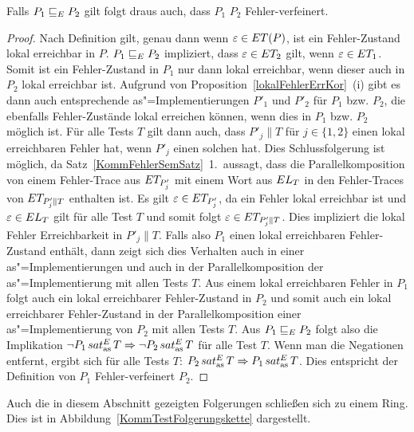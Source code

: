 \begin{Satz}
  \label{KommTestVerfSatz}
  Falls $P_1 \sqsubseteq  _E P_2$ gilt folgt draus auch, dass $P_1$ $P_2$
  Fehler-verfeinert.
\end{Satz}
\begin{proof}
  Nach Definition gilt, genau dann wenn $\varepsilon\in ET (P)$, ist ein
  Fehler-Zustand lokal erreichbar in $P$. $P_1 \sqsubseteq  _E P_2$ impliziert, dass
  $\varepsilon\in ET _2$ gilt, wenn $\varepsilon\in ET _1$. Somit ist ein
  Fehler-Zustand in $P_1$ nur dann lokal erreichbar, wenn dieser auch in $P_2$
  lokal erreichbar ist. Aufgrund von Proposition~\ref{lokalFehlerErrKor}~(i)
  gibt es dann auch entsprechende as"=Implementierungen $P'_1$ und $P'_2$ für
  $P_1$ bzw. $P_2$, die ebenfalls Fehler-Zustände lokal erreichen können, wenn
  dies in $P_1$ bzw. $P_2$ möglich ist. Für alle Tests $T$ gilt dann auch, dass
  $P'_j\|T$ für $j\in\{1,2\}$ einen lokal erreichbaren Fehler hat, wenn $P'_j$
  einen solchen hat. Dies Schlussfolgerung ist möglich, da
  Satz~\ref{KommFehlerSemSatz}~1.\ aussagt, dass die Parallelkomposition von
  einem Fehler-Trace aus $ET _{P'_j}$ mit einem Wort aus $EL _T$ in den
  Fehler-Traces von $ET _{P'_j\|T}$ enthalten ist. Es gilt $\varepsilon\in ET
  _{P'_j}$, da ein Fehler lokal erreichbar ist und $\varepsilon\in EL _T$ gilt
  für alle Test $T$ und somit folgt $\varepsilon\in ET _{P'_j\|T}$. Dies
  impliziert die lokal Fehler Erreichbarkeit in $P'_j\|T$. Falls also $P_1$
  einen lokal erreichbaren Fehler-Zustand enthält, dann zeigt sich dies
  Verhalten auch in einer as"=Implementierungen und auch in der
  Parallelkomposition der as"=Implementierung mit allen Tests $T$. Aus einem
  lokal erreichbaren Fehler in $P_1$ folgt auch ein lokal erreichbarer
  Fehler-Zustand in $P_2$ und somit auch ein lokal erreichbarer Fehler-Zustand
  in der Parallelkomposition einer as"=Implementierung von $P_2$ mit allen
  Tests $T$. Aus $P_1 \sqsubseteq  _E P_2$ folgt also die Implikation $\neg P_1 \hspace{0.05cm}sat_\mathrm{as}^E\hspace{0.05cm} T
  \Rightarrow \neg P_2 \hspace{0.05cm}sat_\mathrm{as}^E\hspace{0.05cm} T$ für alle Test $T$. Wenn man die Negationen
  entfernt, ergibt sich für alle Tests $T$: $P_2\hspace{0.05cm}sat_\mathrm{as}^E\hspace{0.05cm} T\Rightarrow P_1\hspace{0.05cm}sat_\mathrm{as}^E\hspace{0.05cm}
  T$. Dies entspricht der Definition von $P_1$ Fehler-verfeinert $P_2$.
\end{proof}

Auch die in diesem Abschnitt gezeigten Folgerungen schließen sich zu einem
Ring. Dies ist in Abbildung~\ref{KommTestFolgerungskette} dargestellt.

